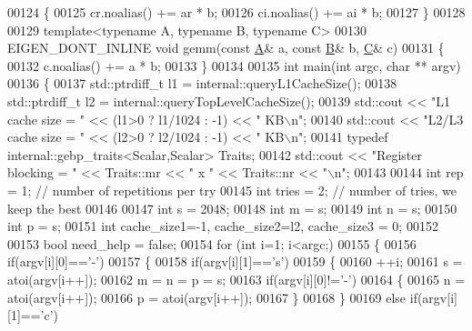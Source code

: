\begin{DoxyCode}
00124 \{
00125   cr.noalias() += ar * b;
00126   ci.noalias() += ai * b;
00127 \}
00128 
00129 \textcolor{keyword}{template}<\textcolor{keyword}{typename} A, \textcolor{keyword}{typename} B, \textcolor{keyword}{typename} C>
00130 EIGEN\_DONT\_INLINE \textcolor{keywordtype}{void} gemm(\textcolor{keyword}{const} \hyperlink{group___core___module_class_eigen_1_1_matrix}{A}& a, \textcolor{keyword}{const} \hyperlink{group___core___module_class_eigen_1_1_matrix}{B}& b, \hyperlink{group___core___module_class_eigen_1_1_matrix}{C}& c)
00131 \{
00132  c.noalias() += a * b;
00133 \}
00134 
00135 \textcolor{keywordtype}{int} main(\textcolor{keywordtype}{int} argc, \textcolor{keywordtype}{char} ** argv)
00136 \{
00137   std::ptrdiff\_t l1 = internal::queryL1CacheSize();
00138   std::ptrdiff\_t l2 = internal::queryTopLevelCacheSize();
00139   std::cout << \textcolor{stringliteral}{"L1 cache size     = "} << (l1>0 ? l1/1024 : -1) << \textcolor{stringliteral}{" KB\(\backslash\)n"};
00140   std::cout << \textcolor{stringliteral}{"L2/L3 cache size  = "} << (l2>0 ? l2/1024 : -1) << \textcolor{stringliteral}{" KB\(\backslash\)n"};
00141   \textcolor{keyword}{typedef} internal::gebp\_traits<Scalar,Scalar> Traits;
00142   std::cout << \textcolor{stringliteral}{"Register blocking = "} << Traits::mr << \textcolor{stringliteral}{" x "} << Traits::nr << \textcolor{stringliteral}{"\(\backslash\)n"};
00143 
00144   \textcolor{keywordtype}{int} rep = 1;    \textcolor{comment}{// number of repetitions per try}
00145   \textcolor{keywordtype}{int} tries = 2;  \textcolor{comment}{// number of tries, we keep the best}
00146 
00147   \textcolor{keywordtype}{int} s = 2048;
00148   \textcolor{keywordtype}{int} m = s;
00149   \textcolor{keywordtype}{int} n = s;
00150   \textcolor{keywordtype}{int} p = s;
00151   \textcolor{keywordtype}{int} cache\_size1=-1, cache\_size2=l2, cache\_size3 = 0;
00152 
00153   \textcolor{keywordtype}{bool} need\_help = \textcolor{keyword}{false};
00154   \textcolor{keywordflow}{for} (\textcolor{keywordtype}{int} i=1; i<argc;)
00155   \{
00156     \textcolor{keywordflow}{if}(argv[i][0]==\textcolor{charliteral}{'-'})
00157     \{
00158       \textcolor{keywordflow}{if}(argv[i][1]==\textcolor{charliteral}{'s'})
00159       \{
00160         ++i;
00161         s = atoi(argv[i++]);
00162         m = n = p = s;
00163         \textcolor{keywordflow}{if}(argv[i][0]!=\textcolor{charliteral}{'-'})
00164         \{
00165           n = atoi(argv[i++]);
00166           p = atoi(argv[i++]);
00167         \}
00168       \}
00169       \textcolor{keywordflow}{else} \textcolor{keywordflow}{if}(argv[i][1]==\textcolor{charliteral}{'c'})

\end{DoxyCode}
